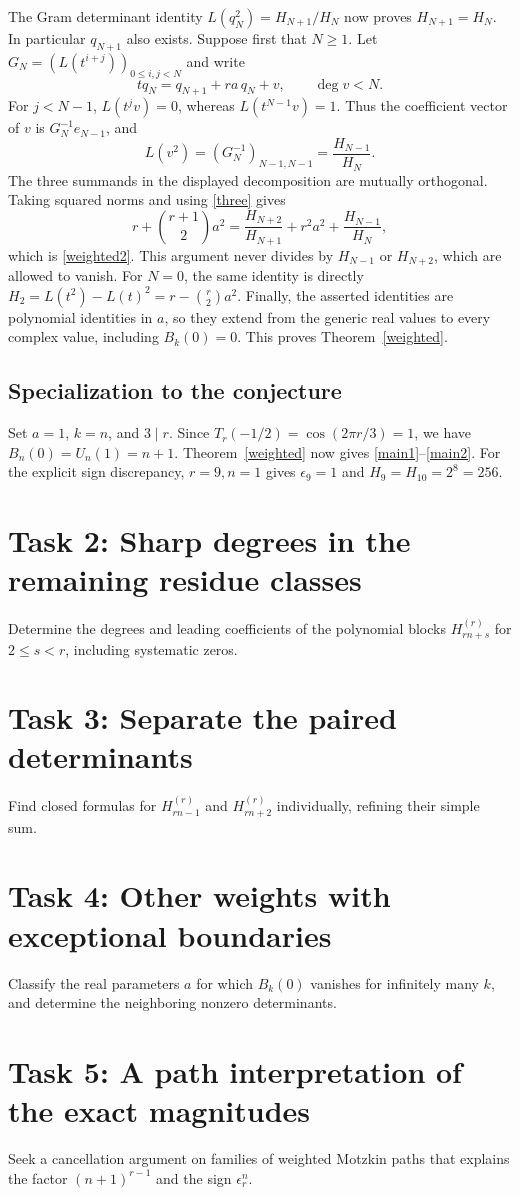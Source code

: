 \documentclass[10pt]{article}
\begin{document}
The Gram determinant identity
$L(q_N^2)=H_{N+1}/H_N$ now proves $H_{N+1}=H_N$.
In particular $q_{N+1}$ also exists. Suppose first that $N\ge1$.
Let $G_N=(L(t^{i+j}))_{0\le i,j<N}$ and write
\[
 tq_N=q_{N+1}+ra\,q_N+v,\qquad \deg v<N.
\]
For $j<N-1$, $L(t^jv)=0$, whereas $L(t^{N-1}v)=1$.
Thus the coefficient vector of $v$ is $G_N^{-1}e_{N-1}$, and
\[
 L(v^2)=(G_N^{-1})_{N-1,N-1}=\frac{H_{N-1}}{H_N}.
\]
The three summands in the displayed decomposition are mutually
orthogonal. Taking squared norms and using \eqref{three} gives
\[
 r+\binom{r+1}{2}a^2
 =\frac{H_{N+2}}{H_{N+1}}+r^2a^2+\frac{H_{N-1}}{H_N},
\]
which is \eqref{weighted2}. This argument never divides by
$H_{N-1}$ or $H_{N+2}$, which are allowed to vanish.
For $N=0$, the same identity is directly
$H_2=L(t^2)-L(t)^2=r-\binom r2a^2$.
Finally, the asserted identities are polynomial identities in $a$,
so they extend from the generic real values to every complex value,
including $B_k(0)=0$. This proves Theorem~\ref{weighted}.

\subsection*{Specialization to the conjecture}
Set $a=1$, $k=n$, and $3\mid r$. Since
$T_r(-1/2)=\cos(2\pi r/3)=1$, we have $B_n(0)=U_n(1)=n+1$.
Theorem~\ref{weighted} now gives \eqref{main1}--\eqref{main2}.
For the explicit sign discrepancy, $r=9,n=1$ gives
$\epsilon_9=1$ and $H_9=H_{10}=2^8=256$.

\section*{Task 2: Sharp degrees in the remaining residue classes}
Determine the degrees and leading coefficients of the polynomial
blocks $H_{rn+s}^{(r)}$ for $2\le s<r$, including systematic zeros.

\section*{Task 3: Separate the paired determinants}
Find closed formulas for $H_{rn-1}^{(r)}$ and $H_{rn+2}^{(r)}$
individually, refining their simple sum.

\section*{Task 4: Other weights with exceptional boundaries}
Classify the real parameters $a$ for which $B_k(0)$ vanishes for
infinitely many $k$, and determine the neighboring nonzero determinants.

\section*{Task 5: A path interpretation of the exact magnitudes}
Seek a cancellation argument on families of weighted Motzkin paths
that explains the factor $(n+1)^{r-1}$ and the sign $\epsilon_r^n$.
\end{document}
